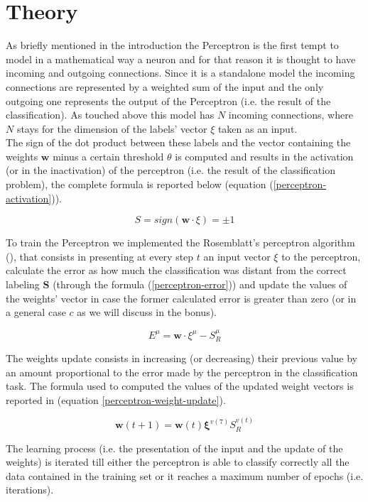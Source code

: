 \section{Theory}
\label{sec:fundamentals}
As briefly mentioned in the introduction the Perceptron is the first tempt to model in a mathematical way
a neuron and for that reason it is thought to have incoming and outgoing connections. Since it is a standalone
model the incoming connections are represented by a weighted sum of the input and the only outgoing one represents
the output of the Perceptron (i.e. the result of the classification). As touched above this model has $N$ incoming connections,
where $N$ stays for the dimension of the labels' vector $\xi$ taken as an input.\\
The sign of the dot product between these labels and the vector containing the weights $\mathsf{\bm{w}}$ minus a certain threshold
$\theta$ is computed and results in the activation (or in the inactivation) of the perceptron (i.e. the result of the classification problem),
the complete formula is reported below (equation (\ref{perceptron-activation})).

\begin{equation} \label{perceptron-activation}
    S = sign(\mathsf{\bm{w}} \cdotp \xi) = \pm 1
\end{equation}

To train the Perceptron we implemented the Rosemblatt's perceptron algorithm (\cite{rosenblatt1958perceptron}), that consists in
presenting at every step $t$ an input vector $\xi$ to the perceptron, calculate the error as how much the classification was distant from
the correct labeling $\bm{S}$ (through the formula (\ref{perceptron-error})) and update the values of the weights' vector in case the former
calculated error is greater than zero (or in a general case $c$ as we will discuss in the bonus).

\begin{equation} \label{perceptron-error}
    E^\mu = \mathsf{\bm{w}} \cdotp \xi^\mu - S^\mu_R
\end{equation}

The weights update consists in increasing (or decreasing) their previous value by an amount proportional to the error made
by the perceptron in the classification task. The formula used to computed the values of the updated weight vectors is reported in (equation
\ref{perceptron-weight-update}).

\begin{equation} \label{perceptron-weight-update}
    \mathsf{\bm{w}}(t+1) = \mathsf{\bm{w}}(t) \bm{\xi}^{v(7)} S^{v(t)}_R
\end{equation}

The learning process (i.e. the presentation of the input and the update of the weights) is iterated till either the perceptron is able to classify correctly
all the data contained in the training set or it reaches a maximum number of epochs (i.e. iterations).